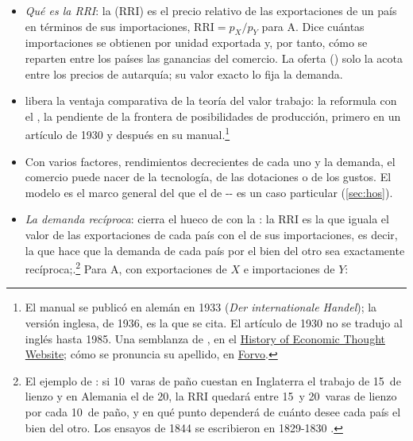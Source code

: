 \documentclass[11pt]{article}
\begin{document}
\begin{itemize}
\item \emph{Qué es la RRI}: la  (RRI) es el precio relativo de las exportaciones de un país en términos de sus importaciones, $\mathrm{RRI}=p_X/p_Y$ para A. Dice cuántas importaciones se obtienen por unidad exportada y, por tanto, cómo se reparten entre los países las ganancias del comercio. La oferta () solo la acota entre los precios de autarquía; su valor exacto lo fija la demanda.

\item {} libera la ventaja comparativa de la teoría del valor trabajo: la reformula con el , la pendiente de la frontera de posibilidades de producción, primero en un artículo de 1930 y después en su manual\nocite{Haberler1930Theorie,Haberler1936Theory}.\footnote{El manual se publicó en alemán en 1933 (\emph{Der internationale Handel}); la versión inglesa, de 1936, es la que se cita. El artículo de 1930 no se tradujo al inglés hasta 1985\nocite{Bernhofen2005Haberler}. Una semblanza de , en el \href{http://www.hetwebsite.net/het/profiles/haberler.htm}{History of Economic Thought Website}; cómo se pronuncia su apellido, en \href{https://forvo.com/search/Haberler/}{Forvo}.}
\item Con varios factores, rendimientos decrecientes de cada uno y la demanda, el comercio puede nacer de la tecnología, de las dotaciones o de los gustos. El modelo es el marco general del que el de -- es un caso particular (\ref{sec:hos}).
\item \emph{La demanda recíproca}:  cierra el hueco de  con la : la RRI es la que iguala el valor de las exportaciones de cada país con el de sus importaciones, es decir, la que hace que la demanda de cada país por el bien del otro sea exactamente recíproca\nocite{Mill1844Essays};\nocite{Mill1848Principles}.\footnote{El ejemplo de : si 10~varas de paño cuestan en Inglaterra el trabajo de 15~de lienzo y en Alemania el de 20, la RRI quedará entre 15~y 20~varas de lienzo por cada 10~de paño, y en qué punto dependerá de cuánto desee cada país el bien del otro\nocite{Mill1848Principles}. Los ensayos de 1844 se escribieron en 1829-1830 .} Para A, con exportaciones de $X$ e importaciones de $Y$:

\end{itemize}
\end{document}

